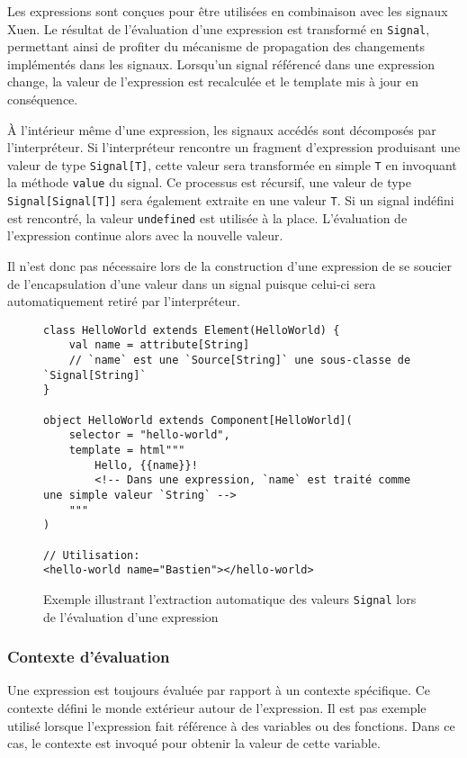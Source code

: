 Les expressions sont conçues pour être utilisées en combinaison avec les signaux Xuen. Le résultat de l'évaluation d'une expression est transformé en \texttt{Signal}, permettant ainsi de profiter du mécanisme de propagation des changements implémentés dans les signaux. Lorsqu'un signal référencé dans une expression change, la valeur de l'expression est recalculée et le template mis à jour en conséquence.

À l'intérieur même d'une expression, les signaux accédés sont décomposés par l'interpréteur. Si l'interpréteur rencontre un fragment d'expression produisant une valeur de type \texttt{Signal[T]}, cette valeur sera transformée en simple \texttt{T} en invoquant la méthode \texttt{value} du signal. Ce processus est récursif, une valeur de type \texttt{Signal[Signal[T]]} sera également extraite en une valeur \texttt{T}. Si un signal indéfini est rencontré, la valeur \texttt{undefined} est utilisée à la place. L'évaluation de l'expression continue alors avec la nouvelle valeur.

Il n'est donc pas nécessaire lors de la construction d'une expression de se soucier de l'encapsulation d'une valeur dans un signal puisque celui-ci sera automatiquement retiré par l'interpréteur.

\begin{figure}[h]
	\begin{lstlisting}
class HelloWorld extends Element(HelloWorld) {
	val name = attribute[String]
	// `name` est une `Source[String]` une sous-classe de `Signal[String]`
}

object HelloWorld extends Component[HelloWorld](
	selector = "hello-world",
	template = html"""
		Hello, {{name}}!
		<!-- Dans une expression, `name` est traité comme une simple valeur `String` -->
	"""
)

// Utilisation:
<hello-world name="Bastien"></hello-world>
	\end{lstlisting}
	\caption{Exemple illustrant l'extraction automatique des valeurs \texttt{Signal} lors de l'évaluation d'une expression}
\end{figure}

\subsubsection{Contexte d'évaluation}
Une expression est toujours évaluée par rapport à un contexte spécifique. Ce contexte défini le monde extérieur autour de l'expression. Il est pas exemple utilisé lorsque l'expression fait référence à des variables ou des fonctions. Dans ce cas, le contexte est invoqué pour obtenir la valeur de cette variable.

